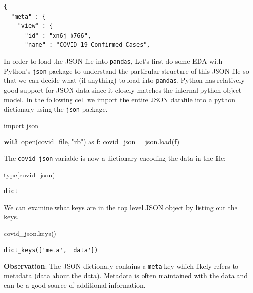 \documentclass[
  letterpaper,
  DIV=11,
  numbers=noendperiod]{scrreprt}
\newenvironment{Shaded}{\begin{snugshade}}{\end{snugshade}}
\newcommand{\BuiltInTok}[1]{\textcolor[rgb]{0.00,0.23,0.31}{#1}}
\newcommand{\ControlFlowTok}[1]{\textcolor[rgb]{0.00,0.23,0.31}{\textbf{#1}}}
\newcommand{\ImportTok}[1]{\textcolor[rgb]{0.00,0.46,0.62}{#1}}
\newcommand{\NormalTok}[1]{\textcolor[rgb]{0.00,0.23,0.31}{#1}}
\newcommand{\OperatorTok}[1]{\textcolor[rgb]{0.37,0.37,0.37}{#1}}
\newcommand{\StringTok}[1]{\textcolor[rgb]{0.13,0.47,0.30}{#1}}
\begin{document}
\begin{verbatim}
{
  "meta" : {
    "view" : {
      "id" : "xn6j-b766",
      "name" : "COVID-19 Confirmed Cases",
\end{verbatim}

In order to load the JSON file into \texttt{pandas}, Let's first do some
EDA with Python's \texttt{json} package to understand the particular
structure of this JSON file so that we can decide what (if anything) to
load into \texttt{pandas}. Python has relatively good support for JSON
data since it closely matches the internal python object model. In the
following cell we import the entire JSON datafile into a python
dictionary using the \texttt{json} package.

\begin{Shaded}
\begin{Highlighting}[]
\ImportTok{import}\NormalTok{ json}

\ControlFlowTok{with} \BuiltInTok{open}\NormalTok{(covid\_file, }\StringTok{"rb"}\NormalTok{) }\ImportTok{as}\NormalTok{ f:}
\NormalTok{    covid\_json }\OperatorTok{=}\NormalTok{ json.load(f)}
\end{Highlighting}
\end{Shaded}

The \texttt{covid\_json} variable is now a dictionary encoding the data
in the file:

\begin{Shaded}
\begin{Highlighting}[]
\BuiltInTok{type}\NormalTok{(covid\_json)}
\end{Highlighting}
\end{Shaded}

\begin{verbatim}
dict
\end{verbatim}

We can examine what keys are in the top level JSON object by listing out
the keys.

\begin{Shaded}
\begin{Highlighting}[]
\NormalTok{covid\_json.keys()}
\end{Highlighting}
\end{Shaded}

\begin{verbatim}
dict_keys(['meta', 'data'])
\end{verbatim}

\textbf{Observation}: The JSON dictionary contains a \texttt{meta} key
which likely refers to metadata (data about the data). Metadata is often
maintained with the data and can be a good source of additional
information.
\end{document}

